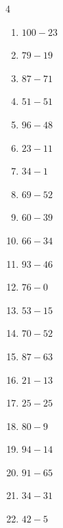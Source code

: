 \begin{multicols}{4}
\begin{enumerate}
  \item $100-23$
        \phantom{$=77$}

  \item $79-19$
        \phantom{$=60$}

  \item $87-71$
        \phantom{$=16$}

  \item $51-51$
        \phantom{$=0$}

  \item $96-48$
        \phantom{$=48$}

\columnbreak %

  \item $23-11$
        \phantom{$=12$}

  \item $34-1$
        \phantom{$=33$}

  \item $69-52$
        \phantom{$=17$}

  \item $60-39$
        \phantom{$=21$}

  \item $66-34$
        \phantom{$=32$}

  \item $93-46$
        \phantom{$=47$}

  \item $76-0$
        \phantom{$=76$}

  \item $53-15$
        \phantom{$=38$}

  \item $70-52$
        \phantom{$=18$}

  \item $87-63$
        \phantom{$=24$}

  \item $21-13$
        \phantom{$=8$}

  \item $25-25$
        \phantom{$=0$}

  \item $80-9$
        \phantom{$=71$}

  \item $94-14$
        \phantom{$=80$}

  \item $91-65$
        \phantom{$=26$}

  \item $34-31$
        \phantom{$=3$}

  \item $42-5$
        \phantom{$=37$}


\end{enumerate}
\end{multicols}
